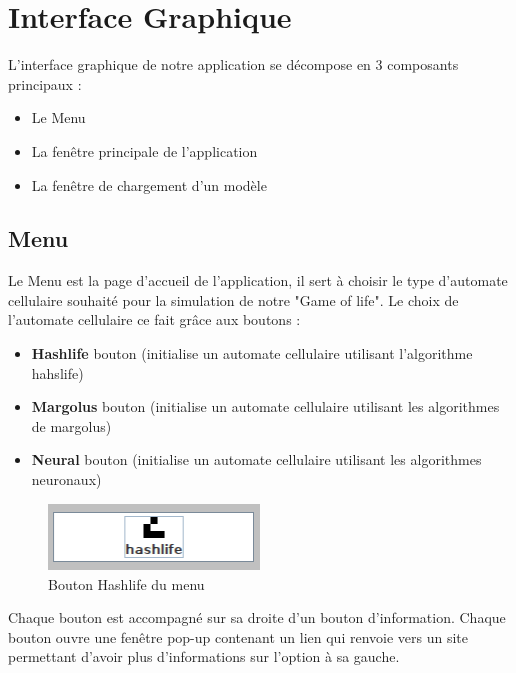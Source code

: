 
\section{Interface Graphique}
\par L'interface graphique de notre application se décompose en 3 composants principaux :
\begin{itemize}
    \item Le Menu
    \item La fenêtre principale de l'application
    \item La fenêtre de chargement d'un modèle
\end{itemize}
\subsection{Menu}
\par Le Menu est la page d'accueil de l'application, il sert à choisir le type d'automate cellulaire souhaité pour la simulation de notre "Game of life". Le choix de l'automate cellulaire ce fait grâce aux boutons :
\begin{itemize}
    \item \textbf{Hashlife} bouton (initialise un automate cellulaire utilisant l'algorithme hahslife)
    \item \textbf{Margolus} bouton (initialise un automate cellulaire utilisant les algorithmes de margolus)
    \item \textbf{Neural} bouton (initialise un automate cellulaire utilisant les algorithmes neuronaux)
\end{itemize}

\begin{figure}[H]
    \centering
    \includegraphics[width=0.5\textwidth]{images/imgInterface/boutons.png}
    \caption{Bouton Hashlife du menu}
    \label{fig:hashlife bouton}
\end{figure}

\par Chaque bouton est accompagné sur sa droite d'un bouton d'information. Chaque bouton ouvre une fenêtre pop-up contenant un lien qui renvoie vers un site permettant d'avoir plus d'informations sur l'option à sa gauche.


